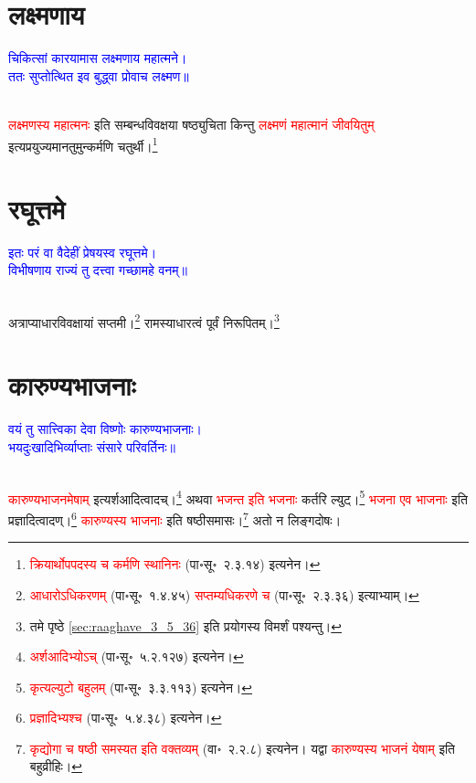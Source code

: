 \section[लक्ष्मणाय]{लक्ष्मणाय}
\centering\textcolor{blue}{चिकित्सां कारयामास लक्ष्मणाय महात्मने।\nopagebreak\\
ततः सुप्तोत्थित इव बुद्ध्वा प्रोवाच लक्ष्मण॥}\nopagebreak\\
\\
\begin{sloppypar}\justifying\noindent\hspace{10mm} \textcolor{red}{लक्ष्मणस्य महात्मनः} इति सम्बन्ध\-विवक्षया षष्ठ्युचिता किन्तु \textcolor{red}{लक्ष्मणं महात्मानं जीवयितुम्‌} इत्यप्रयुज्यमान\-तुमुन्कर्मणि चतुर्थी।\footnote{\textcolor{red}{क्रियार्थोपपदस्य च कर्मणि स्थानिनः} (पा॰सू॰~२.३.१४) इत्यनेन।}\end{sloppypar}
\section[रघूत्तमे]{रघूत्तमे}
\centering\textcolor{blue}{इतः परं वा वैदेहीं प्रेषयस्व रघूत्तमे।\nopagebreak\\
विभीषणाय राज्यं तु दत्त्वा गच्छामहे वनम्॥}\nopagebreak\\
\\
\begin{sloppypar}\justifying\noindent\hspace{10mm} अत्राप्याधार\-विवक्षायां सप्तमी।\footnote{\textcolor{red}{आधारोऽधिकरणम्} (पा॰सू॰~१.४.४५) \textcolor{red}{सप्तम्यधिकरणे च} (पा॰सू॰~२.३.३६) इत्याभ्याम्।} रामस्याधारत्वं पूर्वं निरूपितम्।\footnote{\pageref{sec:raaghave_3_5_36}तमे पृष्ठे \ref{sec:raaghave_3_5_36}  इति प्रयोगस्य विमर्शं पश्यन्तु।}\end{sloppypar}
\section[कारुण्यभाजनाः]{कारुण्यभाजनाः}
\centering\textcolor{blue}{वयं तु सात्त्विका देवा विष्णोः कारुण्यभाजनाः।\nopagebreak\\
भयदुःखादिभिर्व्याप्ताः संसारे परिवर्तिनः॥}\nopagebreak\\
\\
\begin{sloppypar}\justifying\noindent\hspace{10mm} \textcolor{red}{कारुण्य\-भाजनमेषाम्‌} इत्यर्शआदित्वादच्।\footnote{\textcolor{red}{अर्शआदिभ्योऽच्‌} (पा॰सू॰~५.२.१२७) इत्यनेन।} अथवा \textcolor{red}{भजन्त इति भजनाः} कर्तरि ल्युट्।\footnote{\textcolor{red}{कृत्यल्युटो बहुलम्‌} (पा॰सू॰~३.३.११३) इत्यनेन।} \textcolor{red}{भजना एव भाजनाः} इति प्रज्ञादित्वादण्।\footnote{\textcolor{red}{प्रज्ञादिभ्यश्च} (पा॰सू॰~५.४.३८) इत्यनेन।} \textcolor{red}{कारुण्यस्य भाजनाः} इति षष्ठी\-समासः।\footnote{\textcolor{red}{कृद्योगा च षष्ठी समस्यत इति वक्तव्यम्‌} (वा॰~२.२.८) इत्यनेन। यद्वा \textcolor{red}{कारुण्यस्य भाजनं येषाम्‌} इति बहुव्रीहिः।} अतो न लिङ्ग\-दोषः।\end{sloppypar}
